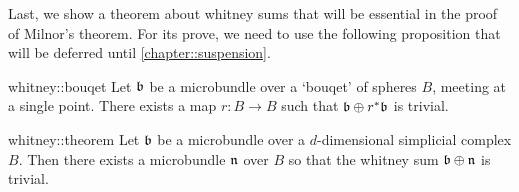 \begin{myparagraph}
    Last, we show a theorem about whitney sums that will be essential in the proof of Milnor's theorem.
    For its prove, we need to use the following proposition that will be deferred until \autoref{chapter::suspension}.
\end{myparagraph}

\begin{myproposition}{whitney::bouqet}
    Let $\mathfrak{b}$ be a microbundle over a `bouqet' of spheres $B$, meeting at a single point.
    There exists a map $r: B \to B$ such that $\mathfrak{b} \oplus{} r^*\mathfrak{b}$ is trivial.
\end{myproposition}

\begin{mytheorem}{whitney::theorem}
    Let $\mathfrak{b}$ be a microbundle over a $d$-dimensional simplicial complex $B$.
    Then there exists a microbundle $\mathfrak{n}$ over $B$ so that the whitney sum $\mathfrak{b} \oplus{} \mathfrak{n}$ is trivial.
\end{mytheorem}

